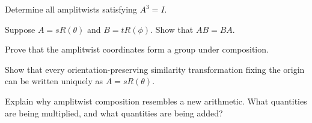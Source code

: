 \begin{exercise}
Determine all amplitwists satisfying $A^3 = I$.
\end{exercise}

\begin{exercise}
Suppose $A = sR(\theta)$ and $B = tR(\phi)$. Show that $AB = BA$.
\end{exercise}

\begin{exercise}
Prove that the amplitwist coordinates form a group under composition.
\end{exercise}

\begin{exercise}
Show that every orientation-preserving similarity transformation fixing
the origin can be written uniquely as $A = sR(\theta)$.
\end{exercise}

\begin{exercise}
Explain why amplitwist composition resembles a new arithmetic. What
quantities are being multiplied, and what quantities are being added?
\end{exercise}
